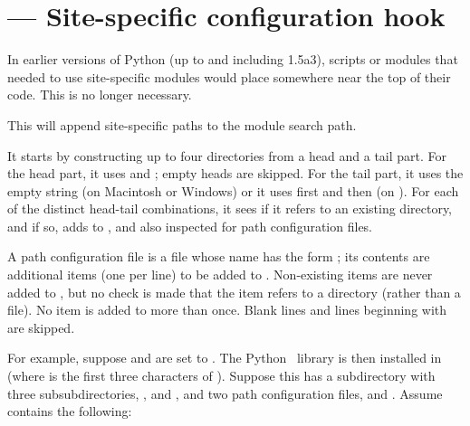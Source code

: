 \section{ ---
         Site-specific configuration hook}




In earlier versions of Python (up to and including 1.5a3), scripts or
modules that needed to use site-specific modules would place
 somewhere near the top of their code.  This is no
longer necessary.

This will append site-specific paths to the module search path.

It starts by constructing up to four directories from a head and a
tail part.  For the head part, it uses  and
; empty heads are skipped.  For
the tail part, it uses the empty string (on Macintosh or Windows) or
it uses first  and then
 (on \UNIX{}).  For each of the distinct
head-tail combinations, it sees if it refers to an existing directory,
and if so, adds to , and also inspected for path
configuration files.

A path configuration file is a file whose name has the form
; its contents are additional items (one
per line) to be added to .  Non-existing items are
never added to , but no check is made that the item
refers to a directory (rather than a file).  No item is added to
 more than once.  Blank lines and lines beginning with
\code{\#} are skipped.

For example, suppose  and  are
set to .  The Python \version\ library is then
installed in  (where
 is the first three characters of ).
Suppose this has a subdirectory
 with three
subsubdirectories, ,  and , and two
path configuration files,  and .  Assume
 contains the following:

